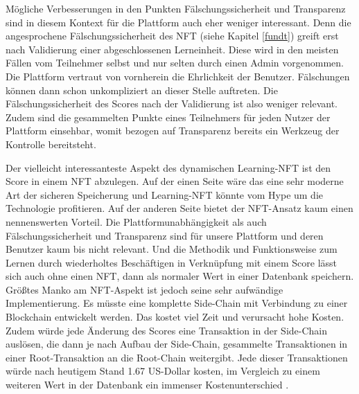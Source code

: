 Mögliche Verbesserungen in den Punkten Fälschungssicherheit und Transparenz sind in diesem Kontext für die Plattform auch eher weniger interessant.
Denn die angesprochene Fälschungssicherheit des NFT (siehe Kapitel \ref{fundt}) greift erst nach Validierung einer abgeschlossenen Lerneinheit.
Diese wird in den meisten Fällen vom Teilnehmer selbst und nur selten durch einen Admin vorgenommen.
Die Plattform vertraut von vornherein die Ehrlichkeit der Benutzer. Fälschungen können dann schon unkompliziert an dieser Stelle auftreten.
Die Fälschungssicherheit des Scores nach der Validierung ist also weniger relevant.
Zudem sind die gesammelten Punkte eines Teilnehmers für jeden Nutzer der Plattform einsehbar, womit bezogen auf Transparenz bereits ein Werkzeug der Kontrolle bereitsteht.

Der vielleicht interessanteste Aspekt des dynamischen Learning-NFT ist den Score in einem NFT abzulegen.
Auf der einen Seite wäre das eine sehr moderne Art der sicheren Speicherung und Learning-\ac{NFT} könnte vom Hype um die Technologie profitieren.
Auf der anderen Seite bietet der NFT-Ansatz kaum einen nennenswerten Vorteil.
Die Plattformunabhängigkeit als auch Fälschungssicherheit und Transparenz sind für unsere Plattform und deren Benutzer kaum bis nicht relevant.
Und die Methodik und Funktionsweise zum Lernen durch wiederholtes Beschäftigen in Verknüpfung mit einem Score lässt sich auch ohne einen NFT, dann als normaler Wert in einer Datenbank speichern.
Größtes Manko am NFT-Aspekt ist jedoch seine sehr aufwändige Implementierung. Es müsste eine komplette Side-Chain mit Verbindung zu einer Blockchain entwickelt werden. Das kostet viel Zeit und verursacht hohe Kosten.
Zudem würde jede Änderung des Scores eine Transaktion in der Side-Chain auslösen, die dann je nach Aufbau der Side-Chain, gesammelte Transaktionen in einer Root-Transaktion an die Root-Chain weitergibt.
Jede dieser Transaktionen würde nach heutigem Stand 1.67 US-Dollar kosten, im Vergleich zu einem weiteren Wert in der Datenbank ein immenser Kostenunterschied \parencite[vgl.][]{Redaktion.04.07.2022}.
